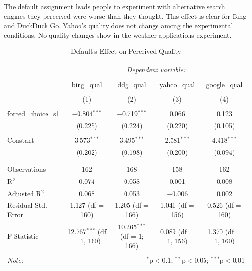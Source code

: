 \documentclass[
  11pt,
]{article}
\begin{document}
The default assignment leads people to experiment with alternative search engines they perceived were worse than they thought. This effect is clear for Bing and DuckDuck Go. Yahoo's quality does not change among the experimental conditions. No quality changes show in the weather applications experiment.

\begin{table} \centering 
  \caption{Default's Effect on Perceived Quality} 
  \label{tab:quals} 
\small 
\begin{tabular}{@{\extracolsep{3pt}}lcccc} 
\\[-1.8ex]\hline 
\hline \\[-1.8ex] 
 & \multicolumn{4}{c}{\textit{Dependent variable:}} \\ 
\cline{2-5} 
\\[-1.8ex] & bing\_qual & ddg\_qual & yahoo\_qual & google\_qual \\ 
\\[-1.8ex] & (1) & (2) & (3) & (4)\\ 
\hline \\[-1.8ex] 
 forced\_choice\_s1 & $-$0.804$^{***}$ & $-$0.719$^{***}$ & 0.066 & 0.123 \\ 
  & (0.225) & (0.224) & (0.220) & (0.105) \\ 
  & & & & \\ 
 Constant & 3.573$^{***}$ & 3.495$^{***}$ & 2.581$^{***}$ & 4.418$^{***}$ \\ 
  & (0.202) & (0.198) & (0.200) & (0.094) \\ 
  & & & & \\ 
\hline \\[-1.8ex] 
Observations & 162 & 168 & 158 & 162 \\ 
R$^{2}$ & 0.074 & 0.058 & 0.001 & 0.008 \\ 
Adjusted R$^{2}$ & 0.068 & 0.053 & $-$0.006 & 0.002 \\ 
Residual Std. Error & 1.127 (df = 160) & 1.205 (df = 166) & 1.041 (df = 156) & 0.526 (df = 160) \\ 
F Statistic & 12.767$^{***}$ (df = 1; 160) & 10.265$^{***}$ (df = 1; 166) & 0.089 (df = 1; 156) & 1.370 (df = 1; 160) \\ 
\hline 
\hline \\[-1.8ex] 
\textit{Note:}  & \multicolumn{4}{r}{$^{*}$p$<$0.1; $^{**}$p$<$0.05; $^{***}$p$<$0.01} \\ 
\end{tabular} 
\end{table}
\end{document}
